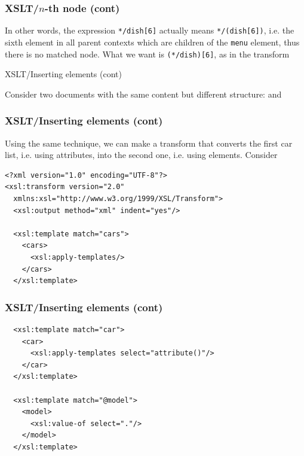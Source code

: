 %
\begin{frame}[containsverbatim]
\frametitle{XSLT/\(n\)-th node (cont)}

In other words, the expression \verb|*/dish[6]| actually means
\verb|*/(dish[6])|, i.e. the sixth element in all parent
contexts which are children of the \texttt{menu} element, thus there
is no matched node. What we want is
\verb|(*/dish)[6]|, as in the transform

\end{frame}

%
\begin{frame}{XSLT/Inserting elements (cont)}
\label{cars}

Consider two documents with the same content but different structure:
and

\end{frame}

%
\begin{frame}[containsverbatim]
\frametitle{XSLT/Inserting elements (cont)}
\label{05list07.xsl}

Using the same technique, we can make a transform that converts the
first car list, i.e. using attributes, into the second one, i.e. using
elements. Consider
{\small
\begin{verbatim}
<?xml version="1.0" encoding="UTF-8"?>
<xsl:transform version="2.0"
  xmlns:xsl="http://www.w3.org/1999/XSL/Transform">
  <xsl:output method="xml" indent="yes"/>

  <xsl:template match="cars">
    <cars>
      <xsl:apply-templates/>
    </cars>
  </xsl:template>
\end{verbatim}
}

\end{frame}

%
\begin{frame}[containsverbatim]
\frametitle{XSLT/Inserting elements (cont)}

{\small
\begin{verbatim}
  <xsl:template match="car">
    <car>
      <xsl:apply-templates select="attribute()"/>
    </car>
  </xsl:template>

  <xsl:template match="@model">
    <model>
      <xsl:value-of select="."/>
    </model>
  </xsl:template>
\end{verbatim}
}

\end{frame}

